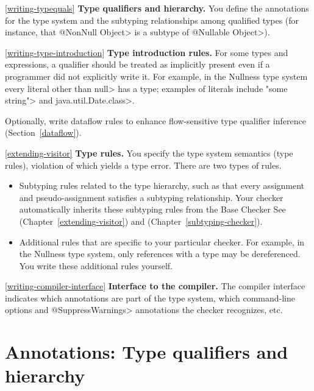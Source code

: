 \begin{description}

\item{\ref{writing-typequals}}
  \textbf{Type qualifiers and hierarchy.}  You define the annotations for
  the type system and the subtyping relationships among qualified types
  (for instance, that \<@NonNull Object> is a subtype of \<@Nullable
  Object>).

\item{\ref{writing-type-introduction}}
  \textbf{Type introduction rules.}  For some types and
  expressions, a qualifier should be treated as implicitly present even if a
  programmer did not explicitly write it.  For example, in the Nullness
  type system every literal
  other than \<null> has a  type;
  examples of literals include \<"some string"> and \<java.util.Date.class>.

  Optionally, write dataflow rules to enhance flow-sensitive type qualifier
  inference (Section~\ref{dataflow}).

\item{\ref{extending-visitor}}
  \textbf{Type rules.}  You specify the type system semantics (type
  rules), violation of which yields a type error.  There are two types of
  rules.
\begin{itemize}
\item
  Subtyping rules related to the type hierarchy, such as that every
  assignment and pseudo-assignment satisfies a subtyping relationship.
  Your checker automatically inherits these subtyping rules from the Base
  Checker See (Chapter~\ref{extending-visitor}) and (Chapter~\ref{subtyping-checker}).
\item
  Additional rules that are specific to your particular checker.  For
  example, in the Nullness type system, only references with a
   type may be dereferenced.  You
  write these additional rules yourself.
\end{itemize}

\item{\ref{writing-compiler-interface}}
  \textbf{Interface to the compiler.}  The compiler interface indicates
  which annotations are part of the type system, which command-line options
  and \<@SuppressWarnings> annotations the checker recognizes, etc.
\end{description}


\section{Annotations: Type qualifiers and hierarchy\label{writing-typequals}}

